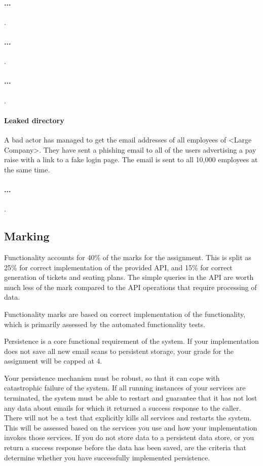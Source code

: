 \documentclass{csse4400}
\begin{document}
\paragraph{...}
.

\paragraph{...}
.

\paragraph{...}
.

\paragraph{Leaked directory}
A bad actor has managed to get the email addresses of all employees of <Large Company>. They have sent a phishing email to all of the users advertising a pay raise with a link to a fake login page. The email is sent to all 10,000 employees at the same time.

\paragraph{...}
.

\subsection{Marking}
Functionality accounts for 40\% of the marks for the assignment. This is split as 25\% for correct implementation of the provided API, and 15\% for correct generation of tickets and seating plans. The simple queries in the API are worth much less of the mark compared to the API operations that require processing of data.

Functionality marks are based on correct implementation of the functionality, which is primarily assessed by the automated functionality tests.

Persistence is a core functional requirement of the system. If your implementation does not save all new email scans to persistent storage, your grade for the assignment will be capped at 4.

Your persistence mechanism must be robust, so that it can cope with catastrophic failure of the system. If all running instances of your services are terminated, the system must be able to restart and guarantee that it has not lost any data about emails for which it returned a success response to the caller. There will not be a test that explicitly kills all services and restarts the system. This will be assessed based on the services you use and how your implementation invokes those services. If you do not store data to a persistent data store, or you return a success response before the data has been saved, are the criteria that determine whether you have successfully implemented persistence.
\end{document}
